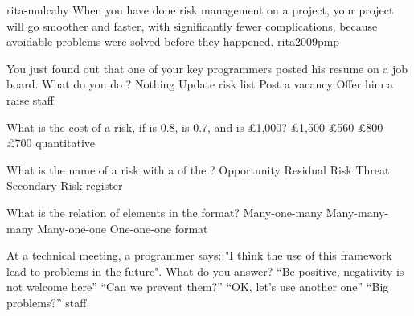 \documentclass{article}
\begin{document}

\lnQuote
  {rita-mulcahy}
  {When you have done risk management on a project,
    your project will go smoother and faster, with significantly
    fewer complications, because avoidable problems
    were solved before they happened.}
  {rita2009pmp}


\pmbaQuestion
  {You just found out that one of your key programmers posted
    his resume on a job board. What do you do ?}
  {Nothing}
  {Update risk list}
  {Post a vacancy}
  {Offer him a raise}
  {staff}

\pmbaQuestion
  {What is the cost of a risk, if  is 0.8,
     is 0.7, and  is \pounds1,000?}
  {\pounds1,500}
  {\pounds560}
  {\pounds800}
  {\pounds700}
  {quantitative}

\pmbaQuestion
  {What is the name of a risk with a 
    of the ?}
  {Opportunity}
  {Residual Risk}
  {Threat}
  {Secondary Risk}
  {register}

\pmbaQuestion
  {What is the relation of elements in the  format?}
  {Many-one-many}
  {Many-many-many}
  {Many-one-one}
  {One-one-one}
  {format}

\pmbaQuestion
  {At a technical meeting, a programmer says: "I think the use
    of this framework  lead to problems in the future".
    What do you answer?}
  {``Be positive, negativity is not welcome here''} %
  {``Can we prevent them?''} %
  {``OK, let's use another one''} %
  {``Big problems?''} %
  {staff}
\end{document}
